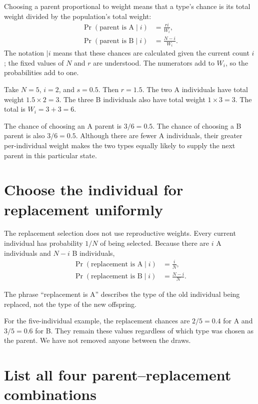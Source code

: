 Choosing a parent proportional to weight means that a type's chance is its
total weight divided by the population's total weight:
\begin{align*}
 \Pr(\text{parent is A}\mid i)&=\frac{ri}{W_i},\\
 \Pr(\text{parent is B}\mid i)&=\frac{N-i}{W_i}.
\end{align*}
The notation \(\mid i\) means that these chances are calculated given the
current count \(i\); the fixed values of \(N\) and \(r\) are understood.
The numerators add to \(W_i\), so the probabilities add to one.

\begin{workedexample}
Take \(N=5\), \(i=2\), and \(s=0.5\). Then \(r=1.5\). The two A
individuals have total weight \(1.5\times2=3\). The three B individuals
also have total weight \(1\times3=3\). The total is \(W_i=3+3=6\).

The chance of choosing an A parent is \(3/6=0.5\). The chance of choosing
a B parent is also \(3/6=0.5\). Although there are fewer A individuals,
their greater per-individual weight makes the two types equally likely to
supply the next parent in this particular state.
\end{workedexample}

\section{Choose the individual for replacement uniformly}

The replacement selection does not use reproductive weights. Every current
individual has probability \(1/N\) of being selected. Because there are
\(i\) A individuals and \(N-i\) B individuals,
\begin{align*}
 \Pr(\text{replacement is A}\mid i)&=\frac{i}{N},\\
 \Pr(\text{replacement is B}\mid i)&=\frac{N-i}{N}.
\end{align*}

The phrase ``replacement is A'' describes the type of the old individual
being replaced, not the type of the new offspring.

For the five-individual example, the replacement chances are \(2/5=0.4\)
for A and \(3/5=0.6\) for B. They remain these values regardless of which
type was chosen as the parent. We have not removed anyone between the draws.

\section{List all four parent--replacement combinations}

